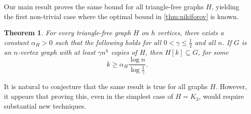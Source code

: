 \documentclass[11pt]{article}
\numberwithin{equation}{section}
\theoremstyle{plain}
\newtheorem{theorem}{Theorem}[section]
\theoremstyle{remark}
\begin{document}
Our main result proves the same bound for all triangle-free graphs $H$, yielding the first non-trivial case where the optimal bound in \cref{thm:nikiforov} is known.
\begin{theorem}\label{thm:main}
    For every triangle-free graph $H$ on $h$ vertices, there exists a constant $\alpha_H>0$ such that the following holds for all $0<\gamma\leq \frac 12$ and all $n$. If $G$ is an $n$-vertex graph with at least $\gamma n^h$ copies of $H$, then $H[k] \subseteq G$, for some
    \[
        k \geq \alpha_H \frac{\log n}{\log \frac 1 \gamma}.
    \]
\end{theorem}
It is natural to conjecture that the same result is true for all graphs $H$. However, it appears that proving this, even in the simplest case of $H=K_3$, would require substantial new techniques. 
\end{document}
